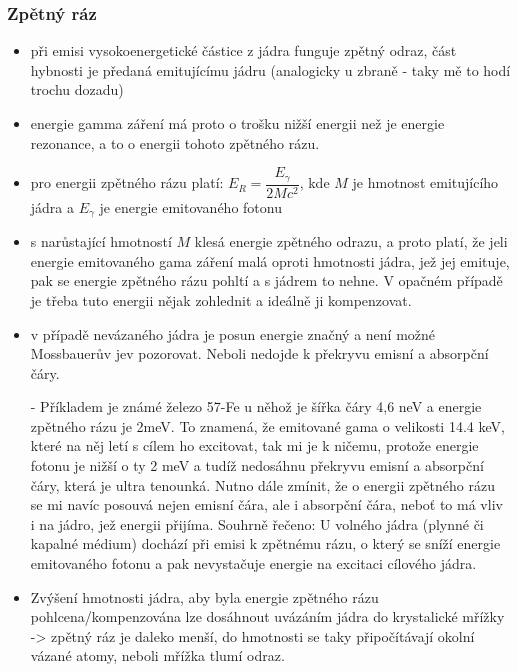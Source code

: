 \subsubsection{Zpětný ráz}
\begin{itemize}

\item při emisi vysokoenergetické částice z jádra funguje zpětný odraz, část hybnosti je předaná emitujícímu jádru (analogicky u zbraně - taky mě to hodí trochu dozadu)

\item energie gamma záření má proto o trošku nižší energii než je energie rezonance, a to o energii tohoto zpětného rázu.

\item pro energii zpětného rázu platí: $E_{R} = \dfrac{E_{\gamma}}{2 M c^2}$, kde $M$ je hmotnost emitujícího jádra a $E_{\gamma}$ je energie emitovaného fotonu

\item s narůstající hmotností $M$ klesá energie zpětného odrazu, a proto platí, že jeli energie emitovaného gama záření malá oproti hmotnosti jádra, jež jej emituje, pak se energie zpětného rázu pohltí a s jádrem to nehne. V opačném případě je třeba tuto energii nějak zohlednit a ideálně ji kompenzovat.

\item v případě nevázaného jádra je posun energie značný a není možné Mossbauerův jev pozorovat. Neboli nedojde k překryvu emisní a absorpční čáry.

- Příkladem je známé železo 57-Fe u něhož je šířka čáry 4,6 neV a energie zpětného rázu je 2meV. To znamená, že emitované gama o velikosti 14.4 keV, které na něj letí s cílem ho excitovat, tak mi je k ničemu, protože energie fotonu je nižší o ty 2 meV a tudíž nedosáhnu překryvu emisní a absorpční čáry, která je ultra tenounká. Nutno dále zmínit, že o energii zpětného rázu se mi navíc posouvá nejen emisní čára, ale i absorpční čára, neboť to má vliv i na jádro, jež energii přijíma. Souhrně řečeno: U volného jádra (plynné či kapalné médium) dochází při emisi k zpětnému rázu, o který se sníží energie emitovaného fotonu a pak nevystačuje energie na excitaci cílového jádra.

\item Zvýšení hmotnosti jádra, aby byla energie zpětného rázu pohlcena/kompenzována lze dosáhnout uvázáním jádra do krystalické mřížky -> zpětný ráz je daleko menší, do hmotnosti se taky připočítávají okolní vázané atomy, neboli mřížka tlumí odraz.
\end{itemize}


